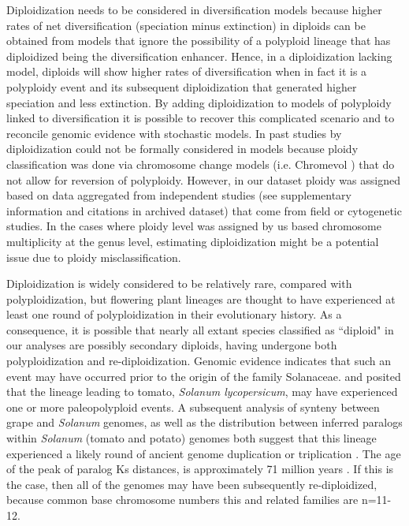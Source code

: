 
Diploidization needs to be considered in diversification models because higher rates of net diversification (speciation minus extinction) in diploids can be obtained from models that ignore the possibility of a polyploid lineage that has diploidized being the diversification enhancer. Hence, in a diploidization lacking model, diploids will show higher rates of diversification when in fact it is a polyploidy event and its subsequent diploidization that generated higher speciation and less extinction.  By adding diploidization to models of polyploidy linked to diversification it is possible to recover this complicated scenario and to reconcile genomic evidence with stochastic models. In past studies by \citet{mayrose_2011, mayrose_2015} diploidization could not be formally  considered in models because ploidy classification was done via chromosome change models (i.e. Chromevol \citep{glick2014}) that do not allow for reversion of polyploidy. However, in our dataset ploidy was assigned based on data aggregated from independent studies (see supplementary information and citations in archived dataset) that come from field or cytogenetic studies. In the cases where ploidy level was assigned by us based chromosome multiplicity at the genus level, estimating diploidization  might be a potential issue due to ploidy misclassification.  

Diploidization is widely considered to be relatively rare, compared with polyploidization, but flowering plant lineages are thought to have experienced at least one round of polyploidization in their evolutionary history.
As a consequence, it is possible that nearly all extant species classified as ``diploid" in our analyses are possibly secondary diploids, having undergone both polyploidization and re-diploidization.
Genomic evidence indicates that such an event may have occurred prior to the origin of the family Solanaceae. 
\citet{ku2000} and \citet{blanc2004} posited that the lineage leading to tomato, \textit{Solanum lycopersicum}, may have experienced one or more paleopolyploid events.
A subsequent analysis of synteny between grape and \textit{Solanum} genomes, as well as the distribution between inferred paralogs within \textit{Solanum} (tomato and potato) genomes both suggest that this lineage experienced a likely round of ancient genome duplication or triplication \citep{tomato2012}. 
The age of the peak of paralog Ks distances, is approximately 71 million years \citep{tomato2012}. 
If this is the case, then all of the genomes may have been subsequently re-diploidized, because common base chromosome numbers this and related families are n=11-12. 


